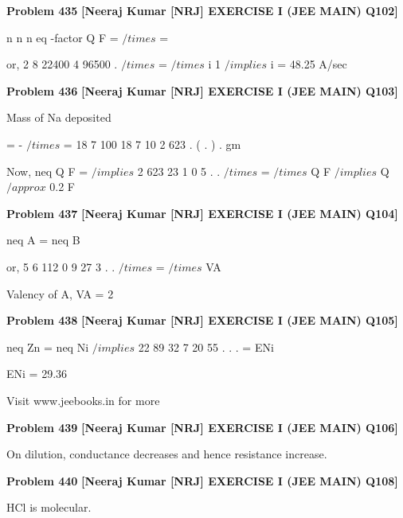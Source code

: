 \begin{problembox}
\textbf{Problem 435} \hfill \textbf{[Neeraj Kumar [NRJ] EXERCISE I (JEE MAIN) Q102]}
\label{q:ext-nrj_all_questions-435}

n
n
n
eq
-factor
Q
F
=
$/times$
=
 
 or, 
2 8
22400
4
96500
.
$/times$
=
$/times$
i
1 $/implies$ i = 48.25 A/sec
\end{problembox}

\begin{problembox}
\textbf{Problem 436} \hfill \textbf{[Neeraj Kumar [NRJ] EXERCISE I (JEE MAIN) Q103]}
\label{q:ext-nrj_all_questions-436}

Mass of Na deposited 
 
  
 
=
-
$/times$
=
18 7
100
18 7
10
2 623
.
(
. )
.
gm
 
 Now, neq
Q
F
=
 $/implies$ 2 623
23
1
0 5
.
.
$/times$ =
$/times$
Q
F
 $/implies$ Q $/approx$ 0.2 F
\end{problembox}

\begin{problembox}
\textbf{Problem 437} \hfill \textbf{[Neeraj Kumar [NRJ] EXERCISE I (JEE MAIN) Q104]}
\label{q:ext-nrj_all_questions-437}

neq A = neq B
 
 or, 5 6
112
0 9
27
3
.
.
$/times$
=
$/times$
VA
 
   Valency of A, VA = 2
\end{problembox}

\begin{problembox}
\textbf{Problem 438} \hfill \textbf{[Neeraj Kumar [NRJ] EXERCISE I (JEE MAIN) Q105]}
\label{q:ext-nrj_all_questions-438}

neq Zn = neq Ni $/implies$ 22 89
32 7
20 55
.
.
.
= ENi
 
 
   ENi = 29.36
 
 
Visit www.jeebooks.in for more
\end{problembox}

\begin{problembox}
\textbf{Problem 439} \hfill \textbf{[Neeraj Kumar [NRJ] EXERCISE I (JEE MAIN) Q106]}
\label{q:ext-nrj_all_questions-439}

On dilution, conductance decreases and hence 
resistance increase.
\end{problembox}

\begin{problembox}
\textbf{Problem 440} \hfill \textbf{[Neeraj Kumar [NRJ] EXERCISE I (JEE MAIN) Q108]}
\label{q:ext-nrj_all_questions-440}

HCl is molecular.
\end{problembox}

